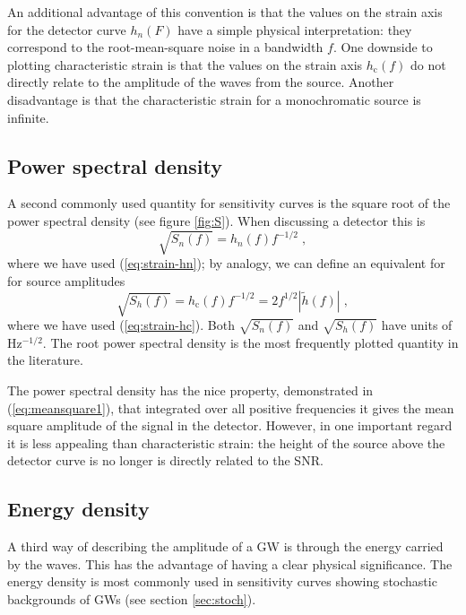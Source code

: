 An additional advantage of this convention is that the values on the strain axis for the detector curve $h_n(F)$ have a simple physical interpretation: they correspond to the root-mean-square noise in a bandwidth $f$. One downside to plotting characteristic strain is that the values on the strain axis $h_\mathrm{c}(f)$ do not directly relate to the amplitude of the waves from the source. Another disadvantage is that the characteristic strain for a monochromatic source is infinite.

\subsection{Power spectral density}\label{sec:psd}


A second commonly used quantity for sensitivity curves is the square root of the power spectral density (see figure \ref{fig:S}). When discussing a detector this is
\begin{equation}\label{eq:temp1}
\sqrt{S_{n}(f)} = h_{n}(f)f^{-1/2} \; ,
\end{equation}
where we have used (\ref{eq:strain-hn}); by analogy, we can define an equivalent for for source amplitudes
\begin{equation}
\sqrt{S_{h}(f)} = h_\mathrm{c}(f)f^{-1/2} = 2 f^{1/2} \left| \tilde{h}(f) \right| \; ,
\label{eq:ShforSources}
\end{equation}
where we have used (\ref{eq:strain-hc}). Both $\sqrt{S_{n}(f)}$ and $\sqrt{S_{h}(f)}$ have units of $\mathrm{Hz^{-1/2}}$. The root power spectral density is the most frequently plotted quantity in the literature.

The power spectral density has the nice property, demonstrated in (\ref{eq:meansquare1}), that integrated over all positive frequencies it gives the mean square amplitude of the signal in the detector. However, in one important regard it is less appealing than characteristic strain: the height of the source above the detector curve is no longer is directly related to the SNR.


\subsection{Energy density}

A third way of describing the amplitude of a GW is through the energy carried by the waves. This has the advantage of having a clear physical significance. The energy density is most commonly used in sensitivity curves showing stochastic backgrounds of GWs (see section \ref{sec:stoch}).

